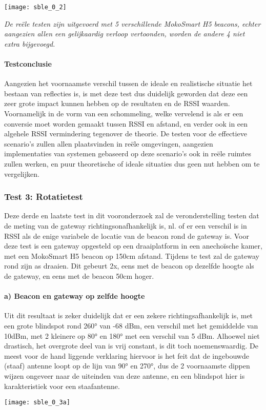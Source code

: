 \texttt{[image: sble\_0\_2]}

\emph{De reële testen zijn uitgevoerd met 5 verschillende MokoSmart H5 beacons, echter aangezien allen een gelijkaardig verloop vertoonden, worden de andere 4 niet extra bijgevoegd.}

\paragraph{Testconclusie}
Aangezien het voornaamste verschil tussen de ideale en realistische situatie het bestaan van reflecties is, is met deze test dus duidelijk geworden dat deze een zeer grote impact kunnen hebben op de resultaten en de RSSI waarden. Voornamelijk in de vorm van een schommeling, welke vervelend is als er een conversie moet worden gemaakt tussen RSSI en afstand, en verder ook in een algehele RSSI vermindering tegenover de theorie. 
De testen voor de effectieve scenario's zullen allen plaatsvinden in reële omgevingen, aangezien implementaties van systemen gebaseerd op deze scenario's ook in reële ruimtes zullen werken, en puur theoretische of ideale situaties dus geen nut hebben om te vergelijken.

\subsubsection{Test 3: Rotatietest}
Deze derde en laatste test in dit vooronderzoek zal de veronderstelling testen dat de meting van de gateway richtingsonafhankelijk is, nl. of er een verschil is in RSSI als de enige variabele de locatie van de beacon rond de gateway is.
Voor deze test is een gateway opgesteld op een draaiplatform in een anechoïsche kamer, met een MokoSmart H5 beacon op 150cm afstand. Tijdens te test zal de gateway rond zijn as draaien. Dit gebeurt 2x, eens met de beacon op dezelfde hoogte als de gateway, en eens met de beacon 50cm hoger.

\paragraph{a) Beacon en gateway op zelfde hoogte}

\begin{minipage}{0.55\textwidth}
Uit dit resultaat is zeker duidelijk dat er een zekere richtingsafhankelijk is, met een grote blindspot rond 260° van -68 dBm, een verschil met het gemiddelde van 10dBm, met 2 kleinere op 80° en 180° met een verschil van 5 dBm. Alhoewel niet drastisch, het overgrote deel van is vrij constant, is dit toch noemenswaardig. De meest voor de hand liggende verklaring hiervoor is het feit dat de ingebouwde (staaf) antenne loopt op de lijn van 90° en 270°, dus de 2 voornaamste dippen wijzen ongeveer naar de uiteinden van deze antenne, en een blindspot hier is karakteristiek voor een staafantenne.
\end{minipage}
\hfill
\begin{minipage}{0.42\textwidth}
	\texttt{[image: sble\_0\_3a]}
\end{minipage}


